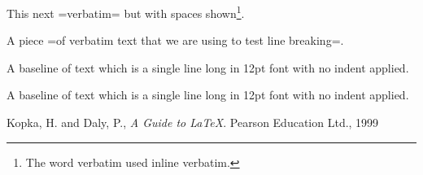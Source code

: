 \bigskip

This next \spverb=verbatim= but with spaces shown\footnote{The word verbatim used inline verbatim.}. 

\bigskip
A piece \spverb=of verbatim text that we are using to test line breaking=.


\bigskip

\noindent
A baseline of text which is a single line long in 12pt font with no indent applied.

\vspace{4\baselineskip}

\noindent
A baseline of text which is a single line long in 12pt font with no indent applied.\marginpar{\rule[-1ex]{0.3em}{4ex}}

\begin{thebibliography}{99}
 Kopka, H. and Daly, P., \textit{A Guide to \LaTeX}. Pearson Education Ltd., 1999
\end{thebibliography}


